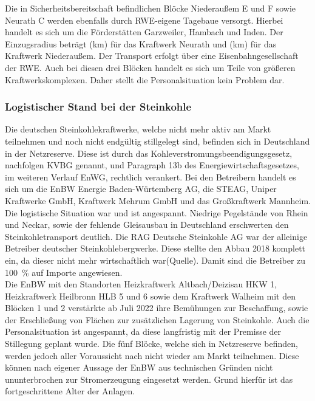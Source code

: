 	Die in Sicherheitsbereitschaft befindlichen Blöcke Niederaußem E und F sowie Neurath C werden ebenfalls durch RWE-eigene Tagebaue versorgt. Hierbei handelt es sich um die Förderstätten Garzweiler, Hambach und Inden. Der Einzugsradius beträgt (km) für das Kraftwerk Neurath und (km) für das Kraftwerk Niederaußem. Der Transport erfolgt über eine Eisenbahngesellschaft der RWE. Auch bei diesen drei Blöcken handelt es sich um Teile von größeren Kraftwerkskomplexen. Daher stellt die Personalsituation kein Problem dar.\cite{Mail_RWE}
	
	\subsubsection{Logistischer Stand bei der Steinkohle} \label{sect: Steinkohle}
	Die deutschen Steinkohlekraftwerke, welche nicht mehr aktiv am Markt teilnehmen und noch nicht endgültig stillgelegt sind, befinden sich in Deutschland in der Netzreserve. Diese ist durch das Kohleverstromungsbeendigungsgesetz, nachfolgen KVBG genannt, und Paragraph 13b des Energiewirtschaftsgesetzes, im weiteren Verlauf EnWG, rechtlich verankert. Bei den Betreibern handelt es sich um die EnBW Energie Baden-Würtemberg AG, die STEAG, Uniper Kraftwerke GmbH, Kraftwerk Mehrum GmbH und das Großkraftwerk Mannheim.\cite{Excel_Kraftwerksliste} \\
	
	Die logistische Situation war und ist angespannt. Niedrige Pegelstände von Rhein und Neckar, sowie der fehlende Gleisausbau in Deutschland erschwerten den Steinkohletransport deutlich. Die RAG Deutsche Steinkohle AG war der alleinige Betreiber deutscher Steinkohlebergwerke. Diese stellte den Abbau 2018 komplett ein, da dieser nicht mehr wirtschaftlich war(Quelle). Damit sind die Betreiber zu \SI{100}{\percent} auf Importe angewiesen.\cite{Ende_Steinkohle}\\
	
	Die EnBW mit den Standorten Heizkraftwerk Altbach/Deizisau HKW 1, Heizkraftwerk Heilbronn HLB 5 und 6 sowie dem Kraftwerk Walheim mit den Blöcken 1 und 2 verstärkte ab Juli 2022 ihre Bemühungen zur Beschaffung, sowie der Erschließung von Flächen zur zusätzlichen Lagerung von Steinkohle. Auch die Personalsituation ist angespannt, da diese langfristig mit der Premisse der Stillegung geplant wurde. Die fünf Blöcke, welche sich in Netzreserve befinden, werden jedoch aller Voraussicht nach nicht wieder am Markt teilnehmen. Diese können nach eigener Aussage der EnBW aus technischen Gründen nicht ununterbrochen zur Stromerzeugung eingesetzt werden. Grund hierfür ist das fortgeschrittene Alter der Anlagen.\cite{EnBW_Steinkohle} \\
	
